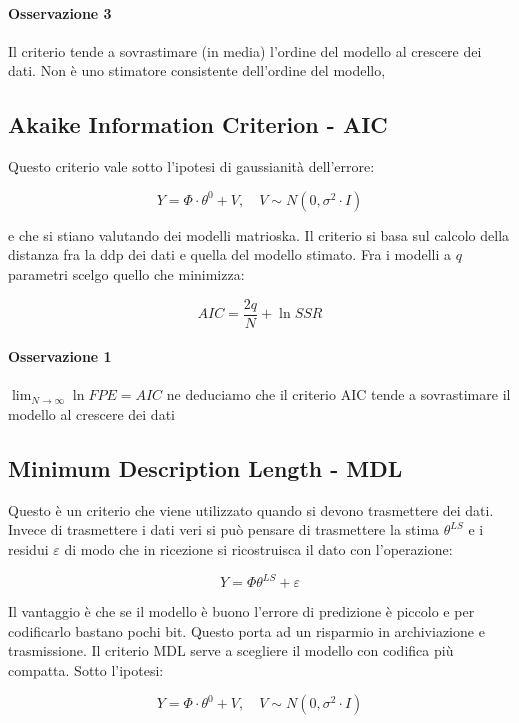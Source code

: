 \paragraph{Osservazione 3} Il criterio tende a sovrastimare (in media) l'ordine del modello al crescere dei dati. Non è uno stimatore consistente dell'ordine del modello,
\subsection{Akaike Information Criterion - AIC}
Questo criterio vale sotto l'ipotesi di gaussianità dell'errore:

    \[ Y=\Phi\cdot\theta^0+V, \quad  V\sim N(0,\sigma^2\cdot I) \]

e che si stiano valutando dei modelli matrioska. Il criterio si basa sul calcolo della distanza fra la ddp dei dati e quella del modello stimato. Fra i modelli a $q$ parametri scelgo quello che minimizza:

    \[ AIC=\frac{2q}{N}+\ln SSR \]

\paragraph{Osservazione 1} $\lim_{N \rightarrow \infty} \ln FPE = AIC $ ne deduciamo che il criterio AIC tende a sovrastimare il modello al crescere dei dati
\subsection{Minimum Description Length - MDL}
Questo è un criterio che viene utilizzato quando si devono trasmettere dei dati. Invece di trasmettere i dati veri si può pensare di trasmettere la stima $\theta^{LS}$ e i residui $\varepsilon$ di modo che in ricezione si ricostruisca il dato con l'operazione:

    \[ Y=\Phi\theta^{LS}+\varepsilon \]

Il vantaggio è che se il modello è buono l'errore di predizione è piccolo e per codificarlo bastano pochi bit. Questo porta ad un risparmio in archiviazione e trasmissione.
Il criterio MDL serve a scegliere il modello con codifica più compatta. Sotto l'ipotesi:

    \[ Y=\Phi\cdot\theta^0+V, \quad V\sim N(0,\sigma^2\cdot I) \]

